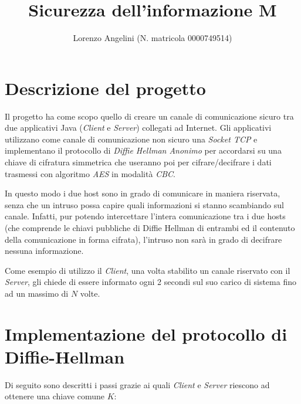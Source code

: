 \documentclass[12pt]{article}
\title{Sicurezza dell'informazione M}
\author{Lorenzo Angelini (N. matricola 0000749514)}
\date{}
\begin{document}
\maketitle

\section*{Descrizione del progetto}

Il progetto ha come scopo quello di creare un canale di comunicazione sicuro tra due applicativi Java (\textit{Client} e \textit{Server}) collegati ad Internet.
Gli applicativi utilizzano come canale di comunicazione non sicuro una \textit{Socket TCP} e implementano il protocollo di \textit{Diffie Hellman Anonimo} per accordarsi su una chiave di cifratura simmetrica che useranno poi per cifrare/decifrare i dati trasmessi con algoritmo \textit{AES} in modalità \textit{CBC}.
\par
In questo modo i due host sono in grado di comunicare in maniera riservata, senza che un intruso possa capire quali informazioni si stanno scambiando sul canale.
Infatti, pur potendo intercettare l'intera comunicazione tra i due hosts (che comprende le chiavi pubbliche di Diffie Hellman di entrambi ed il contenuto della comunicazione in forma cifrata), l'intruso non sarà in grado di decifrare nessuna informazione.
\par
Come esempio di utilizzo il \textit{Client}, una volta stabilito un canale riservato con il \textit{Server}, gli chiede di essere informato ogni 2 secondi sul suo carico di sistema fino ad un massimo di $N$ volte.

\section*{Implementazione del protocollo di Diffie-Hellman}

Di seguito sono descritti i passi grazie ai quali \textit{Client} e \textit{Server} riescono ad ottenere una chiave comune $K$:
\end{document}
